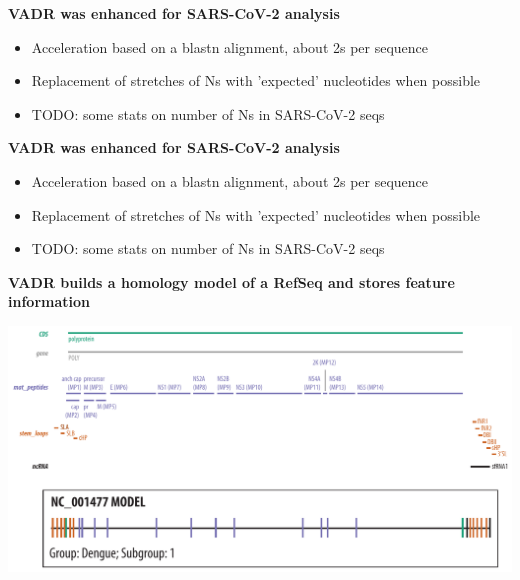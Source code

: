 \documentclass[landscape]{slides}
\begin{document}
\begin{slide}
\begin{center}
\Large{\textbf{VADR was enhanced for SARS-CoV-2 analysis}}
\end{center}

\begin{itemize}
  \item Acceleration based on a blastn alignment, about 2s per sequence
  \item Replacement of stretches of Ns with 'expected' nucleotides when
    possible 
  \item TODO: some stats on number of Ns in SARS-CoV-2 seqs
\end{itemize}

\vfill
\end{slide}
\begin{slide}
\begin{center}
\Large{\textbf{VADR was enhanced for SARS-CoV-2 analysis}}
\end{center}

\begin{itemize}
  \item Acceleration based on a blastn alignment, about 2s per sequence
  \item Replacement of stretches of Ns with 'expected' nucleotides when
    possible 
  \item TODO: some stats on number of Ns in SARS-CoV-2 seqs
\end{itemize}

\vfill
\end{slide}
\begin{slide}
\begin{center}
\textbf{VADR builds a homology model of a RefSeq and stores feature information}

\includegraphics[width=10.5in]{figs/dengue-features}

\end{center}
\vfill
\end{slide}
\end{document}
